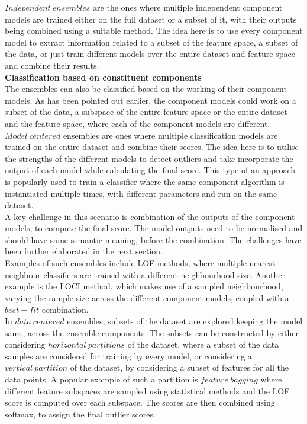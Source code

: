 $Independent\ ensembles$ are the ones where multiple independent component models are trained either on the full dataset or a subset of it, with their outputs being combined using a suitable method. The idea here is to use every component model to extract information related to a subset of the feature space, a subset of the data, or just train different models over the entire dataset and feature space and combine their results. \\

\noindent \textbf{Classification based on constituent components} \\

The ensembles can also be classified based on the working of their component models. As has been pointed out earlier, the component models could work on a subset of the data, a subspace of the entire feature space or the entire dataset and the feature space, where each of the component models are different. \\

$Model\ centered$ ensembles are ones where multiple classification models are trained on the entire dataset and combine their scores. The idea here is to utilise the strengths of the different models to detect outliers and take incorporate the output of each model while calculating the final score. This type of an approach is popularly used to train a classifier where the same component algorithm is instantiated multiple times, with different parameters and run on the same dataset. \\

A key challenge in this scenario is combination of the outputs of the component models, to compute the final score. The model outputs need to be normalised and should have same semantic meaning, before the combination. The challenges have been further elaborated in the next section. \\

Examples of such ensembles include LOF methods, where multiple nearest neighbour classifiers are trained with a different neighbourhood size. Another example is the LOCI method, which makes use of a sampled neighbourhood, varying the sample size across the different component models, coupled with a $best-fit$ combination. \\

In $data\ centered$ ensembles, subsets of the dataset are explored keeping the model same, across the ensemble components. The subsets can be constructed by either considering $horizontal\ partitions$ of the dataset, where a subset of the data samples are considered for training by every model, or considering a $vertical\ partition$ of the dataset, by considering a subset of features for all the data points. A popular example of such a partition is $feature\ bagging$ where different feature subspaces are sampled using statistical methods and the LOF score is computed over each subspace. The scores are then combined using softmax, to assign the final outlier scores. \\


